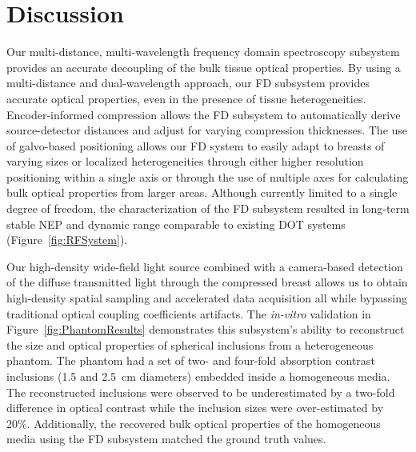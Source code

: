 


\section{Discussion}
\label{chap:omci:discussion}

Our multi-distance, multi-wavelength frequency domain spectroscopy subsystem provides an accurate decoupling of the bulk tissue optical properties. By using a multi-distance and dual-wavelength approach, our FD subsystem provides accurate optical properties, even in the presence of tissue heterogeneities. Encoder-informed compression allows the FD subsystem to automatically derive source-detector distances and adjust for varying compression thicknesses. The use of galvo-based positioning allows our FD system to easily adapt to breasts of varying sizes or localized heterogeneities through either higher resolution positioning within a single axis or through the use of multiple axes for calculating bulk optical properties from larger areas. Although currently limited to a single degree of freedom, the characterization of the FD subsystem resulted in long-term stable NEP and dynamic range comparable to existing DOT systems (Figure~\ref{fig:RFSystem}).  

Our high-density wide-field light source combined with a camera-based detection of the diffuse transmitted light through the compressed breast allows us to obtain high-density spatial sampling and accelerated data acquisition all while bypassing traditional optical coupling coefficients artifacts. The \textit{in-vitro} validation in Figure~\ref{fig:PhantomResults} demonstrates this subsystem's ability to reconstruct the size and optical properties of spherical inclusions from a heterogeneous phantom. The phantom had a set of two- and four-fold absorption contrast inclusions (1.5 and 2.5~cm diameters) embedded inside a homogeneous media. The reconstructed inclusions were observed to be underestimated by a two-fold difference in optical contrast while the inclusion sizes were over-estimated by 20\%. Additionally, the recovered bulk optical properties of the homogeneous media using the FD subsystem matched the ground truth values.  

